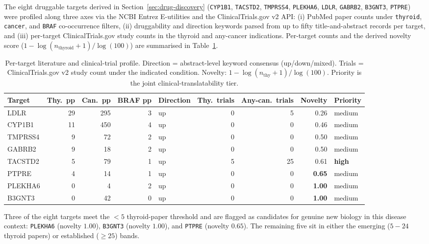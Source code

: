 The eight druggable targets derived in Section~\ref{sec:drug-discovery}
(\texttt{CYP1B1}, \texttt{TACSTD2}, \texttt{TMPRSS4}, \texttt{PLEKHA6}, \texttt{LDLR},
\texttt{GABRB2}, \texttt{B3GNT3}, \texttt{PTPRE}) were profiled along three axes via the
NCBI Entrez E-utilities and the ClinicalTrials.gov v2 API: (i) PubMed paper counts under
\texttt{thyroid}, \texttt{cancer}, and \texttt{BRAF} co-occurrence filters,
(ii) druggability and direction keywords parsed from up to fifty title-and-abstract
records per target, and (iii) per-target ClinicalTrials.gov study counts in the thyroid
and any-cancer indications. Per-target counts and the derived novelty score
($1 - \log(n_\text{thyroid}+1) / \log(100)$) are summarised in
Table~\ref{tab:v12-targets}.

\begin{table}[h]
\centering
\caption{Per-target literature and clinical-trial profile. Direction = abstract-level keyword consensus (up/down/mixed). Trials = ClinicalTrials.gov v2 study count under the indicated condition. Novelty: $1-\log(n_\text{thy}+1)/\log(100)$. Priority is the joint clinical-translatability tier.}
\label{tab:v12-targets}
\begin{tabular}{lrrrlrrrl}
\hline
Target   & Thy.\ pp & Can.\ pp & BRAF pp & Direction & Thy.\ trials & Any-can.\ trials & Novelty & Priority \\
\hline
LDLR     & 29 & 295 & 3 & up & 0 & 5  & 0.26 & medium \\
CYP1B1   & 11 & 450 & 4 & up & 0 & 0  & 0.46 & medium \\
TMPRSS4  &  9 &  72 & 2 & up & 0 & 0  & 0.50 & medium \\
GABRB2   &  9 &  18 & 2 & up & 0 & 0  & 0.50 & medium \\
TACSTD2  &  5 &  79 & 1 & up & 5 & 25 & 0.61 & \textbf{high} \\
PTPRE    &  4 &  14 & 1 & up & 0 & 0  & \textbf{0.65} & medium \\
PLEKHA6  &  0 &   4 & 2 & up & 0 & 0  & \textbf{1.00} & medium \\
B3GNT3   &  0 &  42 & 0 & up & 0 & 0  & \textbf{1.00} & medium \\
\hline
\end{tabular}
\end{table}

Three of the eight targets meet the $<5$ thyroid-paper threshold and are flagged as
candidates for genuine new biology in this disease context: \texttt{PLEKHA6} (novelty
$1.00$), \texttt{B3GNT3} (novelty $1.00$), and \texttt{PTPRE} (novelty $0.65$). The
remaining five sit in either the emerging ($5{-}24$ thyroid papers) or established
($\geq 25$) bands.

